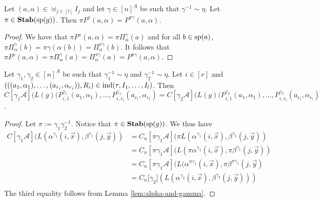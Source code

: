 \documentclass[../main/thesis.tex]{subfiles}
\begin{document}
\begin{lem}
  \label{lem:permuting projections}
  Let $(a, \alpha) \in \uplus_{j \in [l]} I_j$ and let $\gamma \in
  [n]^{\underline{A}}$ be such that $\gamma^{-1} \sim \eta$. Let $\pi \in
  \text{\textbf{Stab}} (\text{sp} (g))$. Then $\pi P^{\gamma}(a, \alpha) = P^{\pi \gamma}(a, \alpha)$.
\end{lem}
\begin{proof}
	We have that $\pi P^{\gamma}(a, \alpha) = \pi \Pi^{\gamma}_{\alpha}(a)$ and
  for all $b \in \text{sp}(a)$, $\pi \Pi^{\gamma}_{\alpha}(b) = \pi \gamma
  (\alpha(b)) = \Pi^{\pi \gamma}_{\alpha}(b)$. It follows that $\pi
  P^{\gamma}(a, \alpha) = \pi \Pi^{\gamma}_{\alpha}(a) = \Pi^{\pi
    \gamma}_{\alpha}(a) = P^{\pi \gamma}(a, \alpha)$.
\end{proof}

\begin{lem}
	\label{lem:changing-gamma-on-projections}
  Let $\gamma_1, \gamma_2 \in [n]^{\underline{A}}$ be such that $\gamma^{-1}_1
  \sim \eta$ and $\gamma^{-1}_2 \sim \eta$. Let $i \in [r]$ and $(((a_1,
  \alpha_1), \ldots, (a_{r_i}, \alpha_{r_i})), R_i) \in \text{\upshape ind}(\tau, I_1, \ldots,
  I_l)$. Then $C[\gamma_1 \mathcal{A}] (L(g)(P^{\gamma_1}_{i, 1}(a_1, \alpha_1),
  \ldots, P^{\gamma_1}_{i, {r_i}}(a_{r_i}, \alpha_{r_i}) = C[\gamma_2
  \mathcal{A}] (L(g)(P^{\gamma_2}_{i, 1}(a_1, \alpha_1), \ldots,
  P^{\gamma_2}_{i, {r_i}}(a_{r_i}, \alpha_{r_i})$.
\end{lem}
\begin{proof}
  Let $\pi := \gamma_1 \gamma^{-1}_2$. Notice that $\pi \in \text{\textbf{Stab}} (\text{sp} (g))$. We thus
  have
	\begin{align*}
		C[\gamma_1 \mathcal{A}](L(\alpha^{\gamma_1}(i, \vec{x}), \beta^{\gamma_1}(j,
		\vec{y})) & = C_n[\pi \gamma_1 \mathcal{A}](\pi L(\alpha^{\gamma_1}(i, \vec{x}), 
                \beta^{\gamma_1}(j, \vec{y})) \\
		          & = C_n[\pi \gamma_1 \mathcal{A}](L(\pi                                
                \alpha^{\gamma_1}(i, \vec{x}), \pi \beta^{\gamma_1}(j, \vec{y}))\\
		          & = C_n[\pi                                                            
                \gamma_1 \mathcal{A}](L(\alpha^{\pi \gamma_1}(i, \vec{x}), \pi \beta^{\pi
                \gamma_1}(j, \vec{y})\\
		          & = C_n[\gamma_2 \mathcal] (L(\alpha^{\gamma_2}(i,                     
                \vec{x}), \beta^{\gamma_2}(j, \vec{y})))\\
	\end{align*}The third equality follows from Lemma \ref{lem:alpha-and-gamma}.
\end{proof}
\end{document}
